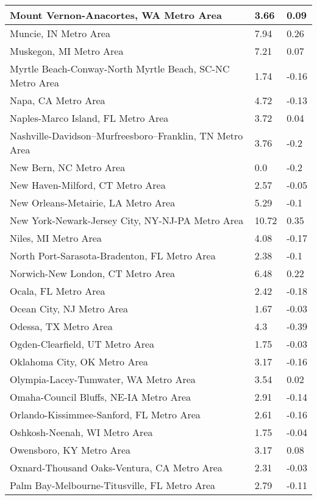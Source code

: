 \documentclass[12pt,oneside, letterpaper]{book}
\begin{document}
\begin{longtable}{| p{} | p{} | p{} |}
    Mount Vernon-Anacortes, WA Metro Area & 3.66 & 0.09 \\ \hline
    Muncie, IN Metro Area & 7.94 & 0.26 \\ \hline
    Muskegon, MI Metro Area & 7.21 & 0.07 \\ \hline
    Myrtle Beach-Conway-North Myrtle Beach, SC-NC Metro Area & 1.74 & -0.16 \\ \hline
    Napa, CA Metro Area & 4.72 & -0.13 \\ \hline
    Naples-Marco Island, FL Metro Area & 3.72 & 0.04 \\ \hline
    Nashville-Davidson--Murfreesboro--Franklin, TN Metro Area & 3.76 & -0.2 \\ \hline
    New Bern, NC Metro Area & 0.0 & -0.2 \\ \hline
    New Haven-Milford, CT Metro Area & 2.57 & -0.05 \\ \hline
    New Orleans-Metairie, LA Metro Area & 5.29 & -0.1 \\ \hline
    New York-Newark-Jersey City, NY-NJ-PA Metro Area & 10.72 & 0.35 \\ \hline
    Niles, MI Metro Area & 4.08 & -0.17 \\ \hline
    North Port-Sarasota-Bradenton, FL Metro Area & 2.38 & -0.1 \\ \hline
    Norwich-New London, CT Metro Area & 6.48 & 0.22 \\ \hline
    Ocala, FL Metro Area & 2.42 & -0.18 \\ \hline
    Ocean City, NJ Metro Area & 1.67 & -0.03 \\ \hline
    Odessa, TX Metro Area & 4.3 & -0.39 \\ \hline
    Ogden-Clearfield, UT Metro Area & 1.75 & -0.03 \\ \hline
    Oklahoma City, OK Metro Area & 3.17 & -0.16 \\ \hline
    Olympia-Lacey-Tumwater, WA Metro Area & 3.54 & 0.02 \\ \hline
    Omaha-Council Bluffs, NE-IA Metro Area & 2.91 & -0.14 \\ \hline
    Orlando-Kissimmee-Sanford, FL Metro Area & 2.61 & -0.16 \\ \hline
    Oshkosh-Neenah, WI Metro Area & 1.75 & -0.04 \\ \hline
    Owensboro, KY Metro Area & 3.17 & 0.08 \\ \hline
    Oxnard-Thousand Oaks-Ventura, CA Metro Area & 2.31 & -0.03 \\ \hline
    Palm Bay-Melbourne-Titusville, FL Metro Area & 2.79 & -0.11 \\ \hline

\end{longtable}
\end{document}
